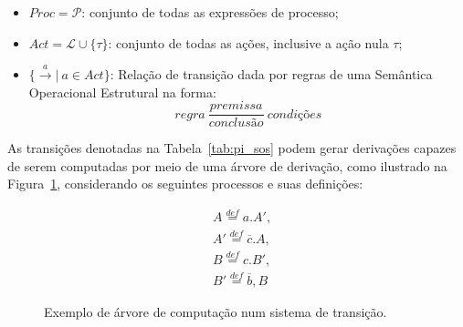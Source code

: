 \begin{itemize}
	\item $Proc = \mathcal{P}$: conjunto de todas as expressões de processo;
	\item $Act = \mathcal{L}\cup\{\tau\}$: conjunto de todas as ações, inclusive a ação nula $\tau$;
	\item $\{\stackrel{a}{\longrightarrow}|~a \in Act\}$: Relação de transição dada por regras de uma Semântica Operacional Estrutural na forma:
\begin{equation}
regra~\dfrac{premissa}{conclusão}~condições 
\end{equation}	
\end{itemize}

As transições denotadas na Tabela~\ref{tab:pi_sos} podem gerar derivações capazes de serem computadas por meio de uma árvore de derivação, como ilustrado na Figura~\ref{fig:ccs_tree}, considerando os seguintes processos e suas definições:

\begin{align}
&A \stackrel{def}{=} a.A', \nonumber \\
&A' \stackrel{def}{=} \overline{c}.A, \nonumber \\
&B \stackrel{def}{=} c.B', \nonumber \\
&B' \stackrel{def}{=} \overline{b},B
\end{align}

\begin{figure}[ht]
	\centering
{}	
	\caption{Exemplo de árvore de computação num sistema de transição.
		\label{fig:ccs_tree}}
\end{figure}
\FloatBarrier

